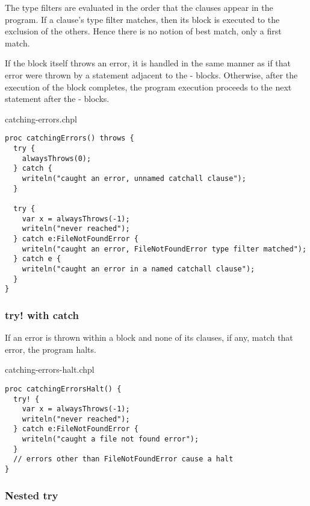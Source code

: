 The type filters are evaluated in the order that the  clauses
appear in the program. If a  clause's type filter matches,
then its block is executed to the exclusion of the others. Hence there
is no notion of best match, only a first match.

If the  block itself throws an error, it is handled in the
same manner as if that error were thrown by a statement adjacent to the
- blocks. Otherwise, after the execution of the
 block completes, the program execution proceeds to the
next statement after the - blocks.

\begin{chapelexample}{catching-errors.chpl}
\begin{chapel}
\begin{verbatim}
proc catchingErrors() throws {
  try {
    alwaysThrows(0);
  } catch {
    writeln("caught an error, unnamed catchall clause");
  }

  try {
    var x = alwaysThrows(-1);
    writeln("never reached");
  } catch e:FileNotFoundError {
    writeln("caught an error, FileNotFoundError type filter matched");
  } catch e {
    writeln("caught an error in a named catchall clause");
  }
}
\end{verbatim}
\end{chapel}
\end{chapelexample}

\subsubsection{try! with catch}
\label{try_bang_with_catch}

If an error is thrown within a  block and none of its
 clauses, if any, match that error, the program halts.

\begin{chapelexample}{catching-errors-halt.chpl}
\begin{chapel}
\begin{verbatim}
proc catchingErrorsHalt() {
  try! {
    var x = alwaysThrows(-1);
    writeln("never reached");
  } catch e:FileNotFoundError {
    writeln("caught a file not found error");
  }
  // errors other than FileNotFoundError cause a halt
}
\end{verbatim}
\end{chapel}
\end{chapelexample}

\subsubsection{Nested try}
\label{Nested_try}

